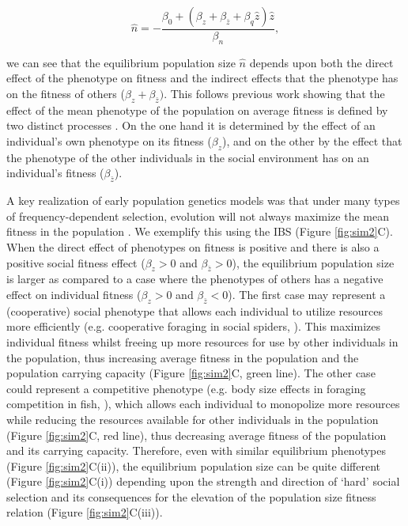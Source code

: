 \documentclass{article}
\begin{document}
	\begin{equation} \label{eq: eq_N_S3}
	\hat{n} = -\frac{\beta_{0} + (\beta_{z} + \beta_{\bar{z}} +  \beta_{q}\hat{z})\hat{z}}{\beta_{n}},
	\end{equation}
	
	\noindent we can see that the equilibrium population size $\hat{n}$ depends upon both the direct effect of the phenotype on fitness and the indirect effects that the phenotype has on the fitness of others ($\beta_{z} + \beta_{\bar{z}})$. This follows previous work showing that the effect of the mean phenotype of the population on average fitness is defined by two distinct processes \citep{Engen2020, Lande2007, Lande1976}. On the one hand it is determined by the effect of an individual's own phenotype on its fitness ($\beta_{z}$), and on the other by the effect that the phenotype of the other individuals in the social environment has on an individual's fitness ($\beta_{\bar{z}}$).
	
	A key realization of early population genetics models was that under many types of frequency-dependent selection, evolution will not always maximize the mean fitness in the population \citep{Fisher1930, Wright1948}. We exemplify this using the IBS (Figure \ref{fig:sim2}C). When the direct effect of phenotypes on fitness is positive and there is also a positive social fitness effect ($\beta_{z}>0$ and $\beta_{\bar{z}}>0$), the equilibrium population size is larger as compared to a case where the phenotypes of others has a negative effect on individual fitness ($\beta_{z}>0$ and $\beta_{\bar{z}}<0$). The first case may represent a (cooperative) social phenotype that allows each individual to utilize resources more efficiently (e.g. cooperative foraging in social spiders, \cite{Majer2018}). This maximizes individual fitness whilst freeing up more resources for use by other individuals in the population, thus increasing average fitness in the population and the population carrying capacity (Figure \ref{fig:sim2}C, green line). The other case could represent a competitive phenotype (e.g. body size effects in foraging competition in fish, \cite{Ward2006}), which allows each individual to monopolize more resources while reducing the resources available for other individuals in the population (Figure \ref{fig:sim2}C, red line), thus decreasing average fitness of the population and its carrying capacity. Therefore, even with similar equilibrium phenotypes (Figure \ref{fig:sim2}C(ii)), the equilibrium population size can be quite different (Figure \ref{fig:sim2}C(i)) depending upon the strength and direction of `hard' social selection and its consequences for the elevation of the population size fitness relation (Figure \ref{fig:sim2}C(iii)). 
	
\end{document}
